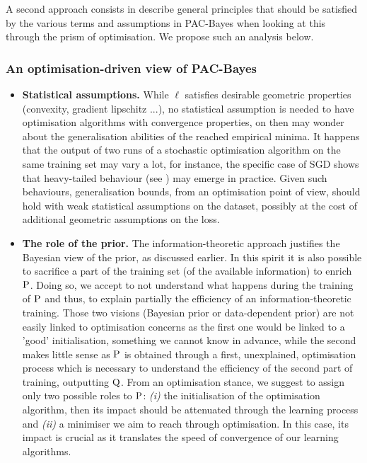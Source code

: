 A second approach consists in describe general principles that should be satisfied by the various terms and assumptions in PAC-Bayes when looking at this through the prism of optimisation. We propose such an analysis below.

\subsubsection*{An optimisation-driven view of PAC-Bayes}

\begin{itemize}
  \item \textbf{Statistical assumptions.} While $\ell$ satisfies desirable geometric properties (convexity, gradient lipschitz ...), no statistical assumption is needed to have optimisation algorithms with convergence properties, on then may wonder about the generalisation abilities of the reached empirical minima. It happens that the output of two runs of a stochastic optimisation algorithm on the same training set may vary a lot, for instance, the specific case of SGD shows that  heavy-tailed behaviour (see \eg \citealp{simsekli2019tail,zhang2020adaptive,gurbuzbalaban2020heavy}) may emerge in practice. Given such behaviours, generalisation bounds, from an optimisation point of view, should hold with weak statistical assumptions on the dataset, possibly at the cost of additional geometric assumptions on the loss.
  \item \textbf{The role of the prior.} The information-theoretic approach justifies the Bayesian view of the prior, as discussed earlier. In this spirit it is also possible to sacrifice a part of the training set (\ie of the available information) to enrich $\P$. Doing so, we accept to not understand what happens during the training of $\P$ and thus, to explain partially the efficiency of an information-theoretic training. Those two visions (Bayesian prior or data-dependent prior) are not easily linked to optimisation concerns as the first one would be linked to a 'good' initialisation, something we cannot know in advance, while the second makes little sense as $\P$ is obtained through a first, unexplained, optimisation process which is necessary to understand the efficiency of the second part of training, outputting $\Q$. From an optimisation stance, we suggest to assign only two possible roles to $\P$: \textit{(i)} the initialisation of the optimisation algorithm, then its impact should be attenuated through the learning process and \textit{(ii)} a minimiser we aim to reach through optimisation. In this case, its impact is crucial as it translates the speed of convergence of our learning algorithms.

\end{itemize}
